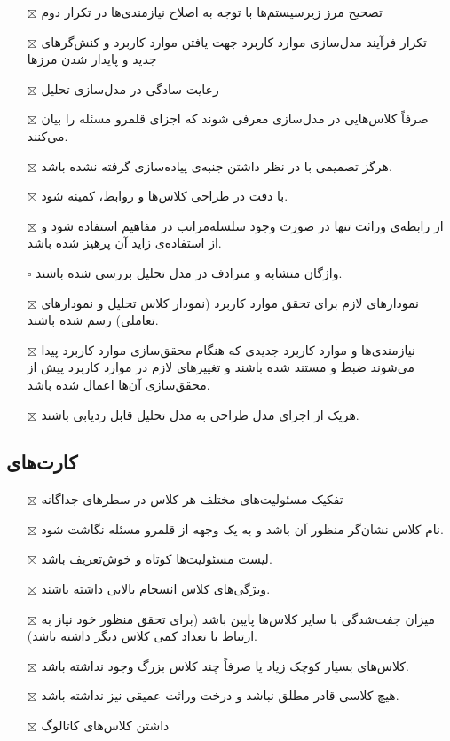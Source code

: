 \begin{itemize} \setlength\itemsep{0cm}
	\item[$\boxtimes$]
	تصحیح مرز زیرسیستم‌ها با توجه به اصلاح نیازمندی‌ها در تکرار دوم
	\item[$\boxtimes$]
	تکرار فرآیند مدل‌سازی موارد کاربرد جهت یافتن موارد کاربرد و کنش‌گرهای جدید و پایدار شدن مرزها
	\item[$\boxtimes$]
	رعایت سادگی در مدل‌سازی تحلیل
	\item[$\boxtimes$]
	صرفاً کلاس‌هایی در مدل‌سازی معرفی شوند که اجزای قلمرو مسئله را بیان می‌کنند.
	\item[$\boxtimes$]
	هرگز تصمیمی با در نظر داشتن جنبه‌ی پیاده‌سازی گرفته نشده باشد.
	\item[$\boxtimes$]
	با دقت در طراحی کلاس‌ها و روابط،  کمینه شود.
	\item[$\boxtimes$]
	از رابطه‌ی وراثت تنها در صورت وجود سلسله‌مراتب در مفاهیم استفاده شود و از استفاده‌ی زاید آن پرهیز شده باشد.
	\item[$\square$]
	واژگان متشابه و مترادف در مدل تحلیل بررسی شده باشند.
	\item[$\boxtimes$]
	نمودارهای لازم برای تحقق موارد کاربرد (نمودار کلاس تحلیل و نمودارهای تعاملی) رسم شده باشند.
	\item[$\boxtimes$]
	نیازمندی‌ها و موارد کاربرد جدیدی که هنگام محقق‌سازی موارد کاربرد پیدا می‌شوند ضبط و مستند شده باشند و تغییرهای لازم در موارد کاربرد پیش از محقق‌سازی آن‌ها اعمال شده باشد.
	\item[$\boxtimes$]
	هریک از اجزای مدل طراحی به مدل تحلیل قابل ردیابی باشند.

\end{itemize}

\subsection{کارت‌های\hspace*{0.2cm} }

\begin{itemize} \setlength\itemsep{0cm}
	\item[$\boxtimes$]
	تفکیک مسئولیت‌های مختلف هر کلاس در سطرهای جداگانه
	\item[$\boxtimes$]
	نام کلاس نشان‌گر منظور آن باشد و به یک وجهه از قلمرو مسئله نگاشت شود.
	\item[$\boxtimes$]
	لیست مسئولیت‌ها کوتاه و خوش‌تعریف باشد.
	\item[$\boxtimes$]
	ویژگی‌های کلاس انسجام بالایی داشته باشند.
	\item[$\boxtimes$]
	میزان جفت‌شدگی با سایر کلاس‌ها پایین باشد (برای تحقق منظور خود نیاز به ارتباط با تعداد کمی کلاس دیگر داشته باشد).
	\item[$\boxtimes$]
	کلاس‌های بسیار کوچک زیاد یا صرفاً چند کلاس بزرگ وجود نداشته باشد.
	\item[$\boxtimes$]
	هیچ کلاسی قادر مطلق نباشد و درخت وراثت عمیقی نیز نداشته باشد.
	\item[$\boxtimes$]
	داشتن کلاس‌های کاتالوگ
\end{itemize}

